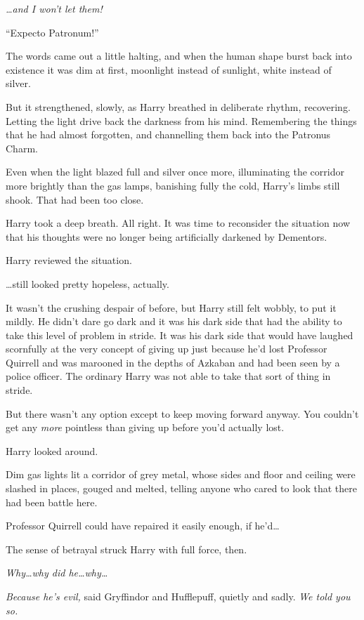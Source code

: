 \emph{…and I won’t let them!}

“Expecto Patronum!”

The words came out a little halting, and when the human shape burst back into existence it was dim at first, moonlight instead of sunlight, white instead of silver.

But it strengthened, slowly, as Harry breathed in deliberate rhythm, recovering. Letting the light drive back the darkness from his mind. Remembering the things that he had almost forgotten, and channelling them back into the Patronus Charm.

Even when the light blazed full and silver once more, illuminating the corridor more brightly than the gas lamps, banishing fully the cold, Harry’s limbs still shook. That had been too close.

Harry took a deep breath. All right. It was time to reconsider the situation now that his thoughts were no longer being artificially darkened by Dementors.

Harry reviewed the situation.

…still looked pretty hopeless, actually.

It wasn’t the crushing despair of before, but Harry still felt wobbly, to put it mildly. He didn’t dare go dark and it was his dark side that had the ability to take this level of problem in stride. It was his dark side that would have laughed scornfully at the very concept of giving up just because he’d lost Professor Quirrell and was marooned in the depths of Azkaban and had been seen by a police officer. The ordinary Harry was not able to take that sort of thing in stride.

But there wasn’t any option except to keep moving forward anyway. You couldn’t get any \emph{more} pointless than giving up before you’d actually lost.

Harry looked around.

Dim gas lights lit a corridor of grey metal, whose sides and floor and ceiling were slashed in places, gouged and melted, telling anyone who cared to look that there had been battle here.

Professor Quirrell could have repaired it easily enough, if he’d…

The sense of betrayal struck Harry with full force, then.

\emph{Why…why did he…why…}

\emph{Because he’s evil,} said Gryffindor and Hufflepuff, quietly and sadly. \emph{We told you so.}

